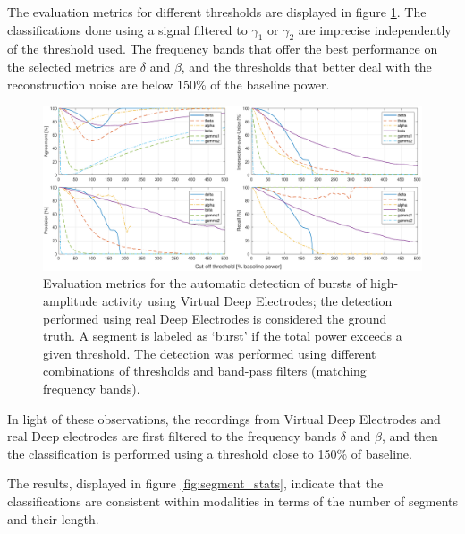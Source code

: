 \documentclass[draftcls, onecolumn, peerreview]{IEEEtran}
\begin{document}
The evaluation metrics for different thresholds are displayed in figure \ref{fig:band}.
%
The classifications done using a signal filtered to $\gamma_1$ or $\gamma_2$ are imprecise independently of the threshold used. 
%
The frequency bands that offer the best performance on the selected metrics are $\delta$ and $\beta$, and the thresholds that better deal with the reconstruction noise are below 150\% of the baseline power.

\begin{figure}[!t]
\centering
\includegraphics[width=16cm]{./graph_agree/MetricRelative}
\caption{Evaluation metrics for the automatic detection of bursts of high-amplitude activity using Virtual Deep Electrodes; the detection performed using real Deep Electrodes is considered the ground truth. 
A segment is labeled as `burst' if the total power exceeds a given threshold.
The detection was performed using different combinations of thresholds and band-pass filters (matching frequency bands).}
\label{fig:band}
\end{figure}

In light of these observations, the recordings from Virtual Deep Electrodes and real Deep electrodes are first filtered to the frequency bands $\delta$ and $\beta$, and then the classification is performed using a threshold close to 150\% of baseline.

The results, displayed in figure \ref{fig:segment_stats}, indicate that the classifications are consistent within modalities in terms of the number of segments and their length.
\end{document}
